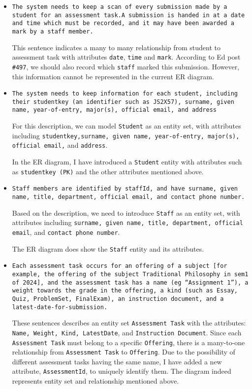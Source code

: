 \documentclass[a4paper,12pt]{article}
\begin{document}
\begin{itemize}
  \item \texttt{The system needs to keep a scan of every submission made by a student for an assessment task.A submission is handed in at a date and time which must be recorded, and it may have been awarded a mark by a staff member.}

  This sentence indicates a many to many relationship from student to assessment task with attributes \texttt{date}, \texttt{time} and \texttt{mark}. According to Ed post \texttt{\#497}, we should also record which \texttt{staff} marked this submission. However, this information cannot be represented in the current ER diagram.

  \item \texttt{The system needs to keep information for each student, including their studentkey (an identifier such as JS2X57), surname, given name, year-of-entry, major(s), official email, and address}

  For this description, we can model \texttt{Student} as an entity set, with attributes including \texttt{studentkey,surname, given name, year-of-entry, major(s), official email,} and \texttt{address}.

  In the ER diagram, I have introduced a \texttt{Student} entity with attributes such as \texttt{studentkey (PK)} and the other attributes mentioned above.

  \item \texttt{Staff members are identified by staffId, and have surname, given name, title, department, official email, and contact phone number. }

  Based on the description, we need to introduce \texttt{Staff} as an entity set, with attributes including \texttt{surname, given name, title, department, official email}, and \texttt{contact phone number}.

  The ER diagram does show the \texttt{Staff} entity and its attributes.

  \item \texttt{Each assessment task occurs for an offering of a subject [for example, the offering of the subject Traditional Philosophy in sem1 of 2024], and the assessment task has a name (eg “Assignment 1”), a weight towards the grade in the offering, a kind (such as Essay, Quiz, ProblemSet, FinalExam), an instruction document, and a latest-date-for-submission.}

  These sentences describes an entity set \texttt{Assessment Task} with the attributes: \texttt{Name, Weight, Kind, LatestDate}, and \texttt{Instruction Document}. Since each \texttt{Assessment Task} must belong to a specific \texttt{Offering}, there is a many-to-one relationship from \texttt{Assessment Task} to \texttt{Offering}. Due to the possibility of different assessment tasks having the same name, I have added a new attribute, \texttt{AssessmentId}, to uniquely identify them. The diagram indeed represents entity set and relationship mentioned above.


\end{itemize}
\end{document}
